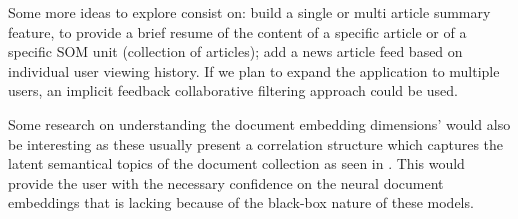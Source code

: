\documentclass[a4paper]{article}
\begin{document}
Some more ideas to explore consist on: build a single or multi article summary feature, to provide a brief resume of the content of a specific article or of a specific SOM unit (collection of articles); add a news article feed based on individual user viewing history. If we plan to expand the application to multiple users, an implicit feedback collaborative filtering \citep{hu2008} approach could be used.

Some research on understanding the document embedding dimensions' would also be interesting as these usually present a correlation structure which captures the latent semantical topics of the document collection as seen in \citet{ji2019}. This would provide the user with the necessary confidence on the neural document embeddings that is lacking because of the black-box nature of these models.



\end{document}

